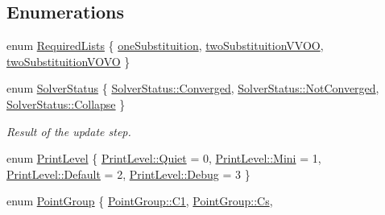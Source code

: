 \subsection*{Enumerations}
\begin{DoxyCompactItemize}
\item 
enum \mbox{\hyperlink{namespaceforte_a0adc3919f741515031673b80ab77f2c7}{Required\+Lists}} \{ \mbox{\hyperlink{namespaceforte_a0adc3919f741515031673b80ab77f2c7a6efb0f8402c14bd51934b9293b088af2}{one\+Substituition}}, 
\mbox{\hyperlink{namespaceforte_a0adc3919f741515031673b80ab77f2c7adf1c9cc277cafc326cbf8cb607212d2a}{two\+Substituition\+V\+V\+OO}}, 
\mbox{\hyperlink{namespaceforte_a0adc3919f741515031673b80ab77f2c7a76d70cc3dc9f9b142c74864f45672900}{two\+Substituition\+V\+O\+VO}}
 \}
\item 
enum \mbox{\hyperlink{namespaceforte_a62f3fc3a26f13fb59a89be14ecc8fa07}{Solver\+Status}} \{ \mbox{\hyperlink{namespaceforte_a62f3fc3a26f13fb59a89be14ecc8fa07ada5418b1eb4e80d05f2c1c7c4fa1b6ec}{Solver\+Status\+::\+Converged}}, 
\mbox{\hyperlink{namespaceforte_a62f3fc3a26f13fb59a89be14ecc8fa07adbbde5ea220b09db210c62e8926a02c5}{Solver\+Status\+::\+Not\+Converged}}, 
\mbox{\hyperlink{namespaceforte_a62f3fc3a26f13fb59a89be14ecc8fa07a2b31634e3cfef1bfdd7d0d2cdfdc3f9d}{Solver\+Status\+::\+Collapse}}
 \}
\begin{DoxyCompactList}\small\item\em Result of the update step. \end{DoxyCompactList}\item 
enum \mbox{\hyperlink{namespaceforte_a9fb94fdd677b63ea549d4195732ba2fa}{Print\+Level}} \{ \mbox{\hyperlink{namespaceforte_a9fb94fdd677b63ea549d4195732ba2faa098753f8980036f4b936e3d4b6997111}{Print\+Level\+::\+Quiet}} = 0, 
\mbox{\hyperlink{namespaceforte_a9fb94fdd677b63ea549d4195732ba2faad3d5b2e9cc26e07d9bf4ebfbab15fda4}{Print\+Level\+::\+Mini}} = 1, 
\mbox{\hyperlink{namespaceforte_a9fb94fdd677b63ea549d4195732ba2faa7a1920d61156abc05a60135aefe8bc67}{Print\+Level\+::\+Default}} = 2, 
\mbox{\hyperlink{namespaceforte_a9fb94fdd677b63ea549d4195732ba2faaa603905470e2a5b8c13e96b579ef0dba}{Print\+Level\+::\+Debug}} = 3
 \}
\item 
enum \mbox{\hyperlink{namespaceforte_abe00ec86d0015c0f2b6ac298c6e428e4}{Point\+Group}} \{ \newline
\mbox{\hyperlink{namespaceforte_abe00ec86d0015c0f2b6ac298c6e428e4a1a2ddc2db4693cfd16d534cde5572cc1}{Point\+Group\+::\+C1}}, 
\mbox{\hyperlink{namespaceforte_abe00ec86d0015c0f2b6ac298c6e428e4a8b847cfae498e96e3fa08a56cb42b838}{Point\+Group\+::\+Cs}}, 

\end{DoxyCompactItemize}
